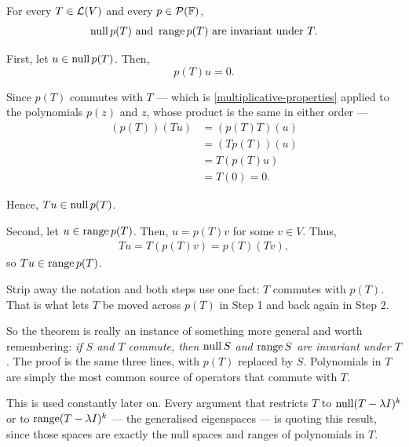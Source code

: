 \begin{thm}
  \label{thm: null space and range of p(T) are invariant under T}
  For every $T \in \mathcal{L}(V)$ and every $p \in \mathcal{P} (\mathbb{F})$,
  \begin{equation}
    \operatorname{null} p(T) \text{ and } \operatorname{range} p(T) \text{ are invariant under } T.
  \end{equation}
\end{thm}
\begin{prf}
  \StepOne First, let $u \in \operatorname{null} p(T)$. Then,
  \begin{equation}
    p(T)u = 0.
  \end{equation}

  Since $p(T)$ commutes with $T$ --- which is \ref{multiplicative-properties} applied to the polynomials $p(z)$ and $z$, whose product is the same in either order ---
  \begin{equation}
    \begin{aligned}
      (p(T))(Tu) &= (p(T)T)(u) \\
      &= (Tp(T))(u) \\
      &= T(p(T)u) \\
      &= T(0) = 0.
    \end{aligned}
  \end{equation}

  Hence, $Tu \in \operatorname{null} p(T)$.

  \StepTwo Second, let $u \in \operatorname{range} p(T)$. Then, $u = p(T)v$ for some $v \in V$. Thus,
  \begin{equation}
    \begin{aligned}
      Tu = T(p(T)v) = p(T)(Tv),
    \end{aligned}
  \end{equation}
  so $Tu \in \operatorname{range} p(T)$.
\end{prf}

\begin{ainote}
  Strip away the notation and both steps use one fact: $T$ commutes with $p(T)$. That is what lets $T$ be moved across $p(T)$ in Step 1 and back again in Step 2.

  So the theorem is really an instance of something more general and worth remembering: \emph{if $S$ and $T$ commute, then $\operatorname{null} S$ and $\operatorname{range} S$ are invariant under $T$}. The proof is the same three lines, with $p(T)$ replaced by $S$. Polynomials in $T$ are simply the most common source of operators that commute with $T$.

  This is used constantly later on. Every argument that restricts $T$ to $\operatorname{null} (T-\lambda I)^k$ or to $\operatorname{range} (T - \lambda I)^k$ --- the generalised eigenspaces --- is quoting this result, since those spaces are exactly the null spaces and ranges of polynomials in $T$.
\end{ainote}
